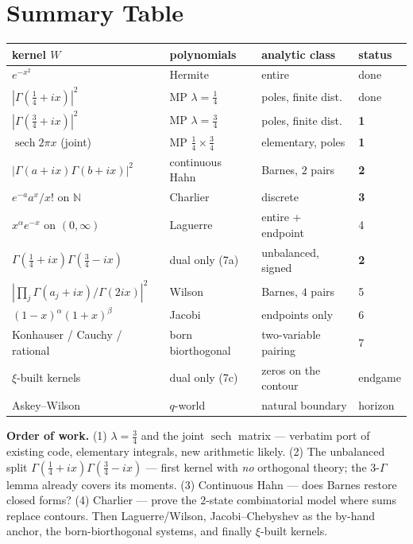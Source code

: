 \documentclass[11pt,a4paper]{article}
\newcommand{\N}{\mathbb{N}}
\begin{document}
\section{Summary Table}

\begin{center}
\small
\begin{tabular}{@{}llll@{}}
\toprule
kernel $W$ & polynomials & analytic class & status \\
\midrule
$e^{-x^2}$                         & Hermite            & entire                & done \\
$|\Gamma(\tfrac14+ix)|^2$          & MP $\lambda=\tfrac14$ & poles, finite dist. & done \\
$|\Gamma(\tfrac34+ix)|^2$          & MP $\lambda=\tfrac34$ & poles, finite dist. & \textbf{1} \\
$\operatorname{sech} 2\pi x$ (joint) & MP $\tfrac14 \times \tfrac34$ & elementary, poles & \textbf{1} \\
$|\Gamma(a+ix)\Gamma(b+ix)|^2$     & continuous Hahn    & Barnes, $2$ pairs     & \textbf{2} \\
$e^{-a}a^x/x!$ on $\N$             & Charlier           & discrete              & \textbf{3} \\
$x^\alpha e^{-x}$ on $(0,\infty)$  & Laguerre           & entire + endpoint     & 4 \\
$\Gamma(\tfrac14+ix)\Gamma(\tfrac34-ix)$ & dual only (7a) & unbalanced, signed  & \textbf{2} \\
$|{\prod_j\Gamma(a_j+ix)}/{\Gamma(2ix)}|^2$ & Wilson    & Barnes, $4$ pairs     & 5 \\
$(1-x)^\alpha(1+x)^\beta$          & Jacobi             & endpoints only        & 6 \\
Konhauser / Cauchy / rational      & born biorthogonal  & two-variable pairing  & 7 \\
$\xi$-built kernels                & dual only (7c)     & zeros on the contour  & endgame \\
Askey--Wilson                      & $q$-world          & natural boundary      & horizon \\
\bottomrule
\end{tabular}
\end{center}

\medskip
\noindent
\textbf{Order of work.}
(1) $\lambda=\tfrac34$ and the joint $\operatorname{sech}$ matrix ---
verbatim port of existing code, elementary integrals, new arithmetic
likely.
(2) The unbalanced split $\Gamma(\tfrac14+ix)\Gamma(\tfrac34-ix)$ ---
first kernel with \emph{no} orthogonal theory; the $3$-$\Gamma$ lemma
already covers its moments.
(3) Continuous Hahn --- does Barnes restore closed forms?
(4) Charlier --- prove the $2$-state combinatorial model where sums
replace contours.
Then Laguerre/Wilson, Jacobi--Chebyshev as the by-hand anchor, the
born-biorthogonal systems, and finally $\xi$-built kernels.
\end{document}

